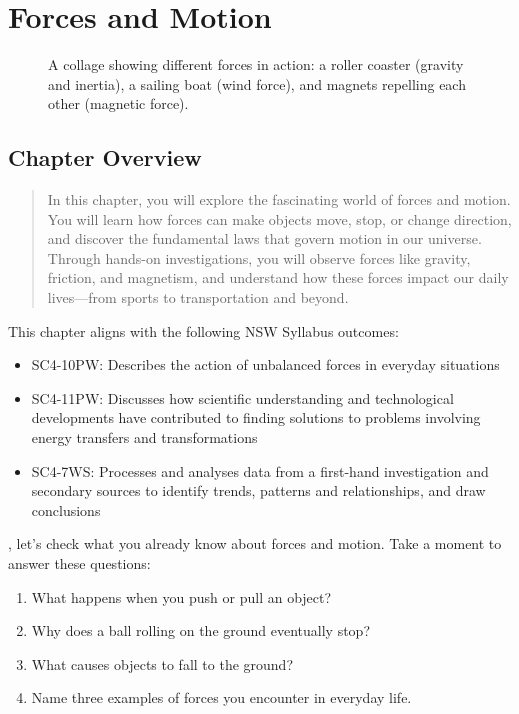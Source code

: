 \documentclass[justified,notoc]{tufte-book}
\newenvironment{stopandthink}{%
    \begin{tcolorbox}[colback=highlight!30,colframe=highlight!50,title=\textbf{Stop and Think}]
}{%
    \end{tcolorbox}
}
\begin{document}
\chapter{Forces and Motion}

\begin{figure}
    \centering
    \fbox{\rule{0pt}{8cm}\rule{12cm}{0pt}}
    \caption{A collage showing different forces in action: a roller coaster (gravity and inertia), a sailing boat (wind force), and magnets repelling each other (magnetic force).}
\end{figure}

\section*{Chapter Overview}

\begin{quote}
    In this chapter, you will explore the fascinating world of forces and motion. You will learn how forces can make objects move, stop, or change direction, and discover the fundamental laws that govern motion in our universe. Through hands-on investigations, you will observe forces like gravity, friction, and magnetism, and understand how these forces impact our daily lives—from sports to transportation and beyond.
\end{quote}

\noindent This chapter aligns with the following NSW Syllabus outcomes:
\begin{itemize}
    \item SC4-10PW: Describes the action of unbalanced forces in everyday situations
    \item SC4-11PW: Discusses how scientific understanding and technological developments have contributed to finding solutions to problems involving energy transfers and transformations
    \item SC4-7WS: Processes and analyses data from a first-hand investigation and secondary sources to identify trends, patterns and relationships, and draw conclusions
\end{itemize}

, let's check what you already know about forces and motion. Take a moment to answer these questions:

\begin{stopandthink}
\begin{enumerate}
    \item What happens when you push or pull an object?
    \item Why does a ball rolling on the ground eventually stop?
    \item What causes objects to fall to the ground?
    \item Name three examples of forces you encounter in everyday life.
\end{enumerate}
\end{stopandthink}
\end{document}
